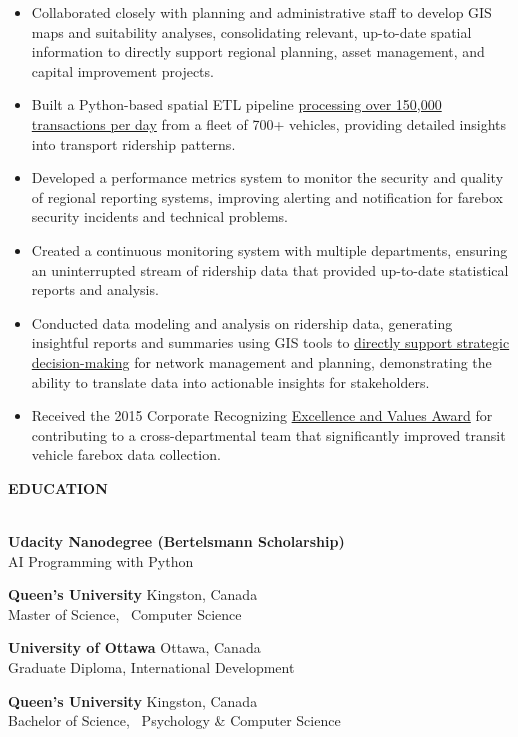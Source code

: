 \documentclass[letterpaper]{article}
\newcommand{\lineunder} {
        \vspace*{-8pt} \\
        \hspace*{-18pt} \hrulefill \\
    }
\newcommand{\header} [1] {
        \vspace{9pt}
        {\hspace*{-18pt}\vspace*{6pt} \large \textbf {#1}}
        \vspace*{-6pt} \lineunder
        \vspace{2pt}
    }
\newenvironment{jobtasklist}
        {
            \vspace{-12pt}
            \begin{itemize} \itemsep 0pt
        }{
            \end{itemize}
            \vspace{-3pt}
        }
\newcommand{\university}[3]{
        \textbf{#1}  %
        \hfill #2\\  %
        #3\\         %
        \vspace{2mm}
    }
\newcommand{\impt}[1]{\uline{#1}}
\begin{document}
\begin{jobtasklist}
    \item Collaborated closely with planning and administrative staff to develop
            GIS maps and suitability analyses, consolidating relevant, up-to-date
            spatial information to directly support regional planning, asset
            management, and capital improvement projects.
    \item Built a Python-based spatial ETL pipeline
            \impt{processing over 150,000 transactions per day}
            from a fleet of 700+ vehicles, providing detailed insights into transport ridership patterns.
    \item Developed a performance metrics system to monitor the security and
            quality of regional reporting systems, improving alerting and
            notification for farebox security incidents and technical problems.
    \item Created a continuous monitoring system with multiple departments,
            ensuring an uninterrupted stream of ridership data that provided
            up-to-date statistical reports and analysis.
    \item Conducted data modeling and analysis on ridership data, generating insightful reports and summaries
            using GIS tools to \impt{directly support strategic decision-making} for network management and planning,
            demonstrating the ability to translate data into actionable insights for stakeholders.
    \item Received the 2015 Corporate Recognizing \impt{Excellence and Values Award}
            for contributing to a cross-departmental team that significantly
            improved transit vehicle farebox data collection.
\end{jobtasklist}



\header{EDUCATION}
    \university
        {Udacity Nanodegree (Bertelsmann Scholarship)}
        {}
        {AI Programming with Python}
    \university
        {Queen's University}
        {Kingston, Canada}
        {Master of Science, ~Computer Science}

    \university
        {University of Ottawa}
        {Ottawa, Canada}
        {Graduate Diploma, International Development}

    \university
        {Queen's University}
        {Kingston, Canada}
        {Bachelor of Science, ~Psychology \& Computer Science}
\end{document}
